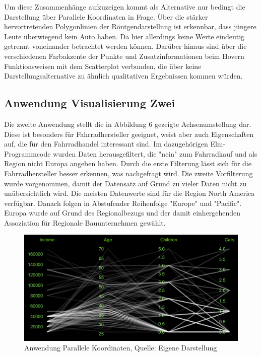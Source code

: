 \documentclass[usegeometry=true]{scrartcl}
\begin{document}
Um diese Zusammenhänge aufzuzeigen kommt als Alternative nur bedingt die Darstellung über Parallele Koordinaten in Frage. Über die stärker hervortretenden Polygonlinien der Röntgendarstellung ist erkennbar, dass jüngere Leute überwiegend kein Auto haben. Da hier allerdings keine Werte eindeutig getrennt voneinander betrachtet werden können. Darüber hinaus sind über die verschiedenen Farbakzente der Punkte und Zusatzinformationen beim Hovern Funktionsweisen mit dem Scatterplot verbunden, die über keine Darstellungsalternative zu ähnlich qualitativen Ergebnissen kommen würden.  

\subsection{Anwendung Visualisierung Zwei}
Die zweite Anwendung stellt die in Abbildung 6 gezeigte Achsenumstellung dar. Diese ist besonders für Fahrradhersteller geeignet, weist aber auch Eigenschaften auf, die für den Fahrradhandel interessant sind. Im dazugehörigen Elm-Programmcode wurden Daten herausgefiltert, die "nein" zum Fahrradkauf und als Region nicht Europa angeben haben. Durch die erste Filterung lässt sich für die Fahrradhersteller besser erkennen, was nachgefragt wird. Die zweite Vorfilterung wurde vorgenommen, damit der Datensatz auf Grund zu vieler Daten nicht zu unübersichtlich wird. Die meisten Datenwerte sind für die Region North America verfügbar. Danach folgen in Abstufender Reihenfolge "Europe" und "Pacific". Europa wurde auf Grund des Regionalbezugs und der damit einhergehenden Assoziation für Regionale Bauunternehmen gewählt.
\begin{figure}[h]
\begin{center}
\includegraphics[width=16cm]{Bilder/ParallelCoordsA2.png}
\caption{Anwendung Parallele Koordinaten, Quelle: Eigene Darstellung}
\end{center}
\end{figure}
\end{document}
